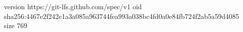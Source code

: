 version https://git-lfs.github.com/spec/v1
oid sha256:4467e2f242e1a3a085a963744fea993a038bc4fd0a0e84fb724f2ab5a59d4085
size 769
